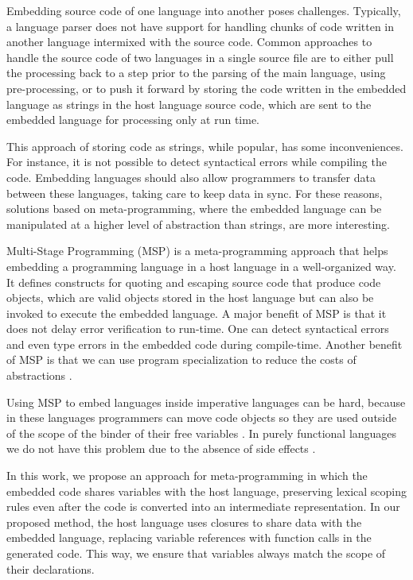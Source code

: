 \documentclass[english]{llncs}
\begin{document}
Embedding source code of one language into another poses challenges.
Typically, a language parser does not have support for handling
chunks of code written in another language intermixed with the source
code. Common approaches to handle the source code of two languages
in a single source file are to either pull the processing back to a
step prior to the parsing of the main language, using pre-processing,
or to push it forward by storing the code written in the embedded
language as strings in the host language source code, which are
sent to the embedded language for processing only at run time.

This approach of storing code as strings, while popular, has some inconveniences.
For instance, it is not possible to detect syntactical errors while compiling the code.
Embedding languages should also allow programmers to transfer data
between these languages, taking care to keep data in sync.
For these reasons, solutions based on meta-programming, where the
embedded language can be manipulated at a higher level of abstraction
than strings, are more interesting.

Multi-Stage Programming (MSP) \cite{Taha1999MSP,Taha2004gentle,Taha2008gentle}
is a meta-programming approach that helps embedding a programming language in
a host language in a well-organized way.
It defines constructs for quoting and escaping source code
that produce code objects, which are valid objects stored in the host
language but can also be invoked to execute the embedded language.
A major benefit of MSP is that it does not delay error verification to run-time.
One can detect syntactical errors and even type errors in the embedded code
during compile-time.
Another benefit of MSP is that we can use program specialization to
reduce the costs of abstractions \cite{Taha1999MSP}.

Using MSP to embed languages inside imperative languages can be hard,
because in these languages programmers can move code objects so they
are used outside of the scope of the binder of their free variables
\cite{Westbrook2010Mint}.
In purely functional languages we do not have this problem 
due to the absence of side effects \cite{Kameyama2008CSS}.

In this work, we propose an approach for meta-programming
in which the embedded code shares variables with the
host language, preserving lexical scoping rules even after the code is
converted into an intermediate representation.
In our proposed method, the host language uses closures
to share data with the embedded language, replacing variable references
with function calls in the generated code.
This way, we ensure that variables always match the scope of their declarations.
\end{document}
